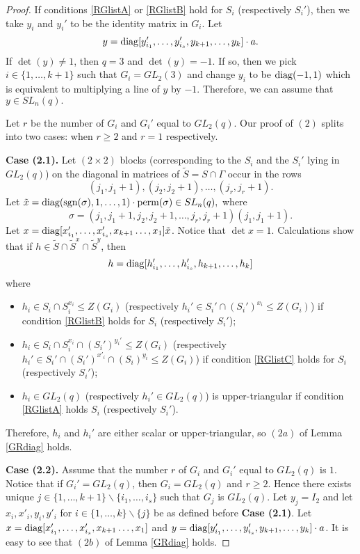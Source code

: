 \begin{proof}
If conditions \ref{RGlistA} or \ref{RGlistB} hold for $S_i$ (respectively $S_i'$), then we take $y_i$ and $y_i'$ to be the identity matrix in $G_i.$ Let 
$$y=\mathrm{diag}[y_{i_1}', \ldots, y_{i_s}', y_{k+1}, \ldots, y_k] \cdot a.$$
If $\det (y) \ne 1$, then $q=3$ and $\det(y)=-1.$ If so, then we pick  $i \in \{1, \ldots, k+1\}$  such that $G_i=GL_2(3)$ and change $y_i$ to be $\mathrm{diag}(-1,1)$ which is equivalent to multiplying a line of $y$ by $-1.$  Therefore, we can assume that $y \in SL_n(q).$   

Let $r$ be the number of $G_i$ and $G_i'$ equal to $GL_2(q)$. Our proof of $(2)$ splits into two cases: 
when $r \ge 2$
and $r=1$ respectively.


\medskip

{\bf Case (2.1).}  
  Let    $(2 \times 2)$ blocks (corresponding to the $S_i$ and the $S_i'$ lying in $GL_2(q)$) on the diagonal in matrices of $\tilde{S}=S \cap \Gamma$ occur in the rows $$(j_1, j_1+1), (j_2, j_2 +1), \ldots, (j_r, j_r+1).$$ 
Let $\tilde{x}=\mathrm{diag}(\mathrm{sgn}(\sigma), 1, \ldots, 1) \cdot {\rm perm}(\sigma) \in SL_n(q),$ where  $$\sigma=(j_1, j_1+1, j_2, j_2 +1, \ldots, j_r, j_r+1)(j_1, j_1+1).$$  
Let $x= \mathrm{diag}[x_{i_1}',\ldots, x_{i_s}', x_{k+1}  \ldots, x_1]\tilde{x}$. Notice that $\det x=1.$ Calculations show that if $h \in \tilde{S} \cap \tilde{S}^x \cap \tilde{S}^y$, then 
$$h=\mathrm{diag}[h'_{i_1}, \ldots, h'_{i_s}, h_{k+1}, \ldots, h_k]$$
where
\begin{itemize}
\item $h_i \in S_i \cap S_i^{x_i} \le Z(G_i)$ (respectively $h_i' \in S_i' \cap (S_i')^{x_i} \le Z(G_i)$) if condition \ref{RGlistB} holds for $S_i$ (respectively $S_i'$);
\item $h_i \in S_i \cap S_i^{x_i} \cap (S_i')^{y_i'} \le Z(G_i)$ (respectively $h_i' \in S_i' \cap (S_i')^{x'_i} \cap (S_i)^{y_i} \le Z(G_i)$) if condition \ref{RGlistC} holds for $S_i$ (respectively $S_i'$);
\item $h_i \in GL_2(q)$ (respectively $h_i' \in GL_2(q)$) is upper-triangular if condition \ref{RGlistA} holds
$S_i$ (respectively $S_i'$).
\end{itemize}
 Therefore, $h_i$ and $h_i'$ are either scalar or upper-triangular, so  $(2a)$   of Lemma \ref{GRdiag} holds.

\medskip

{\bf Case (2.2).} Assume that the number $r$ of $G_i$ and $G_i'$ equal to $GL_2(q)$ is $1$. Notice that if $G_i'=GL_2(q)$, then $G_i=GL_2(q)$ and $r \ge 2.$ Hence there exists unique $j \in \{1, \ldots, k+1\} \backslash \{i_1, \ldots, i_s\}$ such that $G_j$ is $GL_2(q)$.  Let $y_j=I_2$  and let $x_i, x'_i, y_i, y'_i$ for $i \in \{1, \ldots, k\} \backslash \{j\}$  be as defined before {\bf Case (2.1)}. Let $x=\mathrm{diag}[x_{i_1}',\ldots, x_{i_s}', x_{k+1}  \ldots, x_1]$ and $y=\mathrm{diag}[y_{i_1}', \ldots, y_{i_s}', y_{k+1}, \ldots, y_k] \cdot a$. It is easy to see that $(2b)$   of Lemma \ref{GRdiag} holds.  
\end{proof}

